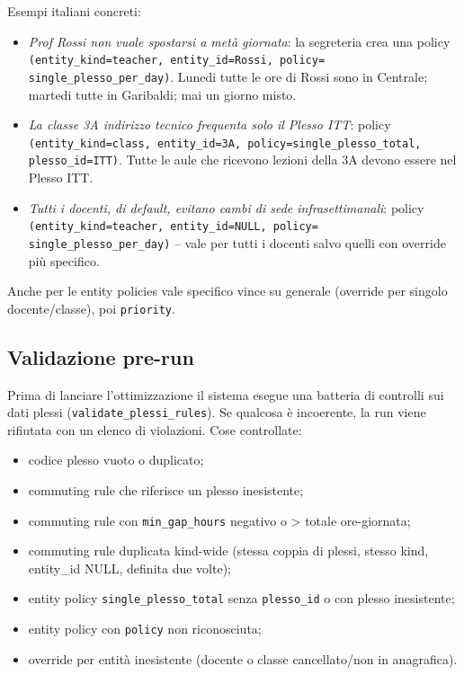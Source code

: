Esempi italiani concreti:

\begin{itemize}
\item \emph{Prof Rossi non vuole spostarsi a met\`a
giornata}: la segreteria crea una policy
\texttt{(entity\_kind=teacher, entity\_id=Rossi, policy=
single\_plesso\_per\_day)}. Lunedi tutte le ore di Rossi
sono in Centrale; martedi tutte in Garibaldi; mai un
giorno misto.
\item \emph{La classe 3A indirizzo tecnico frequenta solo il
Plesso ITT}: policy \texttt{(entity\_kind=class,
entity\_id=3A, policy=single\_plesso\_total,
plesso\_id=ITT)}. Tutte le aule che ricevono lezioni della
3A devono essere nel Plesso ITT.
\item \emph{Tutti i docenti, di default, evitano cambi di
sede infrasettimanali}: policy
\texttt{(entity\_kind=teacher, entity\_id=NULL, policy=
single\_plesso\_per\_day)} -- vale per tutti i docenti
salvo quelli con override pi\`u specifico.
\end{itemize}

Anche per le entity policies vale specifico vince su
generale (override per singolo docente/classe), poi
\texttt{priority}.

\subsection{Validazione pre-run}

Prima di lanciare l'ottimizzazione il sistema esegue una
batteria di controlli sui dati plessi
(\texttt{validate\_plessi\_rules}). Se qualcosa \`e
incoerente, la run viene rifiutata con un elenco di
violazioni. Cose controllate:

\begin{itemize}
\item codice plesso vuoto o duplicato;
\item commuting rule che riferisce un plesso inesistente;
\item commuting rule con \texttt{min\_gap\_hours} negativo o
\textgreater{} totale ore-giornata;
\item commuting rule duplicata kind-wide (stessa coppia di
plessi, stesso kind, entity\_id NULL, definita due volte);
\item entity policy \texttt{single\_plesso\_total} senza
\texttt{plesso\_id} o con plesso inesistente;
\item entity policy con \texttt{policy} non riconosciuta;
\item override per entit\`a inesistente (docente o classe
cancellato/non in anagrafica).
\end{itemize}

